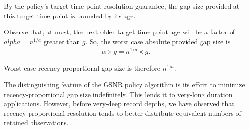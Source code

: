 By the policy's target time point resolution guarantee, the gap size provided at this target time point is bounded by its age.

Observe that, at most, the next older target time point age will be a factor of $alpha = n^{1/a}$ greater than $g$.
So, the worst case absolute provided gap size is
\begin{align*}
\alpha \times g = n^{1/a} \times g.
\end{align*}

Worst case recency-proportional gap size is therefore $n^{1/a}$.

The distinguishing feature of the GSNR policy algorithm is its effort to minimize recency-proportional gap size indefinitely.
This lends it to very-long duration applications.
However, before very-deep record depths, we have observed that recency-proportional resolution tends to better distribute equivalent numbers of retained observations.








